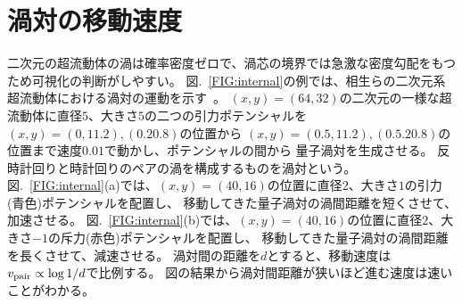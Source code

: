 \documentclass[12pt,a4paper]{jbook}
\begin{document}
		\section{渦対の移動速度}
        二次元の超流動体の渦は確率密度ゼロで、渦芯の境界では急激な密度勾配をもつため可視化の判断がしやすい。
        図.~\ref{FIG:internal}の例では、相生らの二次元系超流動体における渦対の運動を示す~\cite{Aioi0}。
        $(x,y)=(64,32)$の二次元の一様な超流動体に直径$5$、大きさ$5$の二つの引力ポテンシャルを
        $(x,y)=(0,11.2),(0.20.8)$の位置から
        $(x,y)=(0.5,11.2),(0.5.20.8)$の位置まで速度$0.01$で動かし、ポテンシャルの間から
        量子渦対を生成させる。
		反時計回りと時計回りのペアの渦を構成するものを渦対という。
        図.~\ref{FIG:internal}(a)では、$(x,y)=(40,16)$の位置に直径$2$、大きさ$1$の引力(青色)ポテンシャルを配置し、
        移動してきた量子渦対の渦間距離を短くさせて、加速させる。
        図.~\ref{FIG:internal}(b)では、$(x,y)=(40,16)$の位置に直径$2$、大きさ$-1$の斥力(赤色)ポテンシャルを配置し、
        移動してきた量子渦対の渦間距離を長くさせて、減速させる。
		渦対間の距離を$d$とすると、移動速度は$v_{\rm pair} \propto \log 1/d$で比例する。
		図の結果から渦対間距離が狭いほど進む速度は速いことがわかる。
\end{document}
